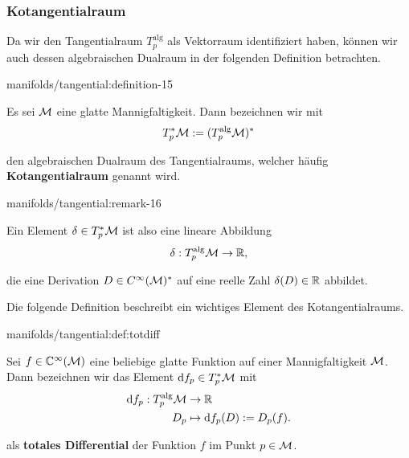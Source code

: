 \subsubsection{Kotangentialraum}
\label{\detokenize{manifolds/tangential:kotangentialraum}}
\par
Da wir den Tangentialraum \(T^{\text{alg}}_p\) als Vektorraum identifiziert haben, können wir auch dessen algebraischen Dualraum in der folgenden Definition betrachten.
\begin{definition}{}{manifolds/tangential:definition-15}



\par
Es sei \(\mathcal{M}\) eine glatte Mannigfaltigkeit.
Dann bezeichnen wir mit
\begin{align*}
T_p^\ast\mathcal{M}:= (T_p^{\text{alg}}\mathcal{M})^\ast
\end{align*}
\par
den algebraischen Dualraum des Tangentialraums, welcher häufig \textbf{Kotangentialraum} genannt wird.
\end{definition}
\begin{remark}{}{manifolds/tangential:remark-16}



\par
Ein Element \(\delta\in T_p^\ast\mathcal{M}\) ist also eine lineare Abbildung
\begin{align*}
\delta: T_p^{\text{alg}}\mathcal{M} \to \mathbb{R},
\end{align*}
\par
die eine Derivation \(D\in C^\infty(\mathcal{M})^\ast\) auf eine reelle Zahl \(\delta(D)\in\mathbb{R}\) abbildet.
\end{remark}

\par
Die folgende Definition beschreibt ein wichtiges Element des Kotangentialraums.
\begin{definition}{}{manifolds/tangential:def:totdiff}



\par
Sei \(f\in\mathbb{C}^\infty(\mathcal{M})\) eine beliebige glatte Funktion auf einer Mannigfaltigkeit \(\mathcal{M}\).
Dann bezeichnen wir das Element \(\mathrm{d}f_p \in T_p^\ast\mathcal{M}\) mit
\begin{align*}
\mathrm{d}f_p: T_p^{\text{alg}}\mathcal{M} &\to\mathbb{R}\\
D_p &\mapsto \mathrm{d}f_p(D):= D_p(f).
\end{align*}
\par
als \textbf{totales Differential} der Funktion \(f\) im Punkt \(p \in \mathcal{M}\).
\end{definition}

